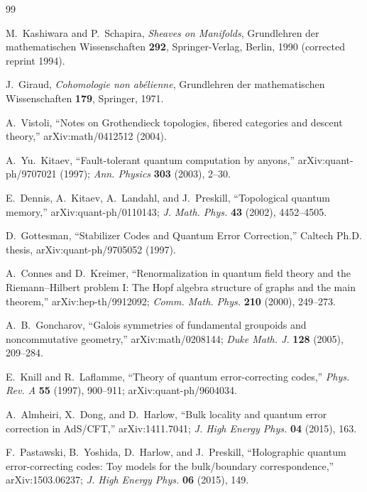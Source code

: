 \documentclass[12pt]{article}
\theoremstyle{definition}
\theoremstyle{remark}
\begin{document}
\begin{thebibliography}{99}
\raggedright

M.~Kashiwara and P.~Schapira,
\emph{Sheaves on Manifolds},
Grundlehren der mathematischen Wissenschaften \textbf{292},
Springer-Verlag, Berlin, 1990 (corrected reprint 1994).

J.~Giraud,
\emph{Cohomologie non ab\'elienne},
Grundlehren der mathematischen Wissenschaften \textbf{179},
Springer, 1971.

A.~Vistoli,
``Notes on Grothendieck topologies, fibered categories and descent theory,''
arXiv:math/0412512 (2004).

A.~Yu.~Kitaev,
``Fault-tolerant quantum computation by anyons,''
arXiv:quant-ph/9707021 (1997);
\emph{Ann. Physics} \textbf{303} (2003), 2--30.

E.~Dennis, A.~Kitaev, A.~Landahl, and J.~Preskill,
``Topological quantum memory,''
arXiv:quant-ph/0110143;
\emph{J. Math. Phys.} \textbf{43} (2002), 4452--4505.

D.~Gottesman,
``Stabilizer Codes and Quantum Error Correction,''
Caltech Ph.D. thesis, arXiv:quant-ph/9705052 (1997).

A.~Connes and D.~Kreimer,
``Renormalization in quantum field theory and the Riemann--Hilbert problem I:
The Hopf algebra structure of graphs and the main theorem,''
arXiv:hep-th/9912092;
\emph{Comm. Math. Phys.} \textbf{210} (2000), 249--273.

A.~B.~Goncharov,
``Galois symmetries of fundamental groupoids and noncommutative geometry,''
arXiv:math/0208144;
\emph{Duke Math. J.} \textbf{128} (2005), 209--284.

E.~Knill and R.~Laflamme,
``Theory of quantum error-correcting codes,''
\emph{Phys. Rev. A} \textbf{55} (1997), 900--911;
arXiv:quant-ph/9604034.

A.~Almheiri, X.~Dong, and D.~Harlow,
``Bulk locality and quantum error correction in AdS/CFT,''
arXiv:1411.7041;
\emph{J. High Energy Phys.} \textbf{04} (2015), 163.

F.~Pastawski, B.~Yoshida, D.~Harlow, and J.~Preskill,
``Holographic quantum error-correcting codes: Toy models for the bulk/boundary
correspondence,''
arXiv:1503.06237;
\emph{J. High Energy Phys.} \textbf{06} (2015), 149.


\end{thebibliography}
\end{document}
